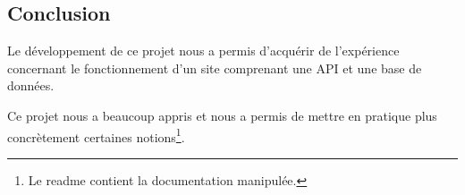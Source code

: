 \subsection{Conclusion}
\begin{flushleft}
Le développement de ce projet nous a permis d'acquérir de l'expérience concernant le fonctionnement d'un site comprenant une API et une base de données.
\end{flushleft}
\begin{flushleft}
Ce projet nous a beaucoup appris et nous a permis de mettre en pratique plus concrètement certaines notions\footnote{Le readme contient la documentation manipulée.}.
\end{flushleft}
